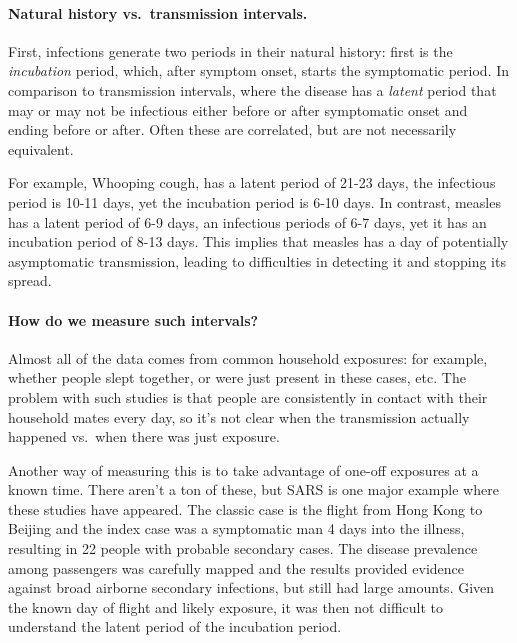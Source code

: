 \documentclass[12pt]{article}
\begin{document}
\paragraph{Natural history vs.\ transmission intervals.} First, infections generate two periods in their natural history: first is the \emph{incubation} period, which, after symptom onset, starts the symptomatic period. In comparison to transmission intervals, where the disease has a \emph{latent} period that may or may not be infectious either before or after symptomatic onset and ending before or after. Often these are correlated, but are not necessarily equivalent.

For example, Whooping cough, has a latent period of 21-23 days, the infectious period is 10-11 days, yet the incubation period is 6-10 days. In contrast, measles has a latent period of 6-9 days, an infectious periods of 6-7 days, yet it has an incubation period of 8-13 days. This implies that measles has a day of potentially asymptomatic transmission, leading to difficulties in detecting it and stopping its spread.

\paragraph{How do we measure such intervals?} Almost all of the data comes from common household exposures: for example, whether people slept together, or were just present in these cases, etc. The problem with such studies is that people are consistently in contact with their household mates every day, so it's not clear when the transmission actually happened vs.\ when there was just exposure.

Another way of measuring this is to take advantage of one-off exposures at a known time. There aren't a ton of these, but SARS is one major example where these studies have appeared. The classic case is the flight from Hong Kong to Beijing and the index case was a symptomatic man 4 days into the illness, resulting in 22 people with probable secondary cases. The disease prevalence among passengers was carefully mapped and the results provided evidence against broad airborne secondary infections, but still had large amounts. Given the known day of flight and likely exposure, it was then not difficult to understand the latent period of the incubation period.
\end{document}
